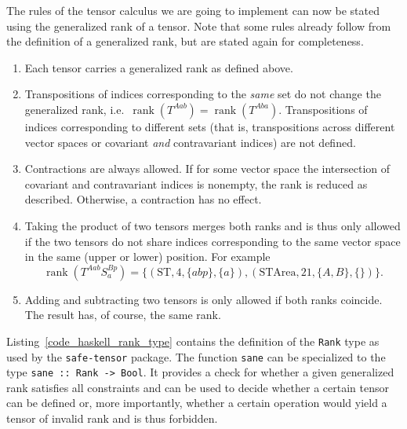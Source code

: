 The rules of the tensor calculus we are going to implement can now be stated using the generalized rank of a tensor. Note that some rules already follow from the definition of a generalized rank, but are stated again for completeness.
\begin{enumerate}
  \item Each tensor carries a generalized rank as defined above.
  \item Transpositions of indices corresponding to the \emph{same} set do not change the generalized rank, i.e.\ $\operatorname{rank}(T^{Aab}) = \operatorname{rank}(T^{Aba})$. Transpositions of indices corresponding to different sets (that is, transpositions across different vector spaces or covariant \emph{and} contravariant indices) are not defined.
  \item Contractions are always allowed. If for some vector space the intersection of covariant and contravariant indices is nonempty, the rank is reduced as described. Otherwise, a contraction has no effect.
  \item Taking the product of two tensors merges both ranks and is thus only allowed if the two tensors do not share indices corresponding to the same vector space in the same (upper or lower) position. For example
    \begin{equation}
      \operatorname{rank}(T^{Aab} S^{Bp}_{a}) = \{(\text{ST}, 4, \{abp\}, \{a\}), (\text{STArea}, 21, \{A,B\}, \{\})\}.
    \end{equation}
  \item Adding and subtracting two tensors is only allowed if both ranks coincide. The result has, of course, the same rank.
\end{enumerate}

Listing~\ref{code_haskell_rank_type} contains the definition of the \texttt{Rank} type as used by the \texttt{safe-tensor} package. The function \texttt{sane} can be specialized to the type \texttt{sane :: Rank -> Bool}. It provides a check for whether a given generalized rank satisfies all constraints and can be used to decide whether a certain tensor can be defined or, more importantly, whether a certain operation would yield a tensor of invalid rank and is thus forbidden.

